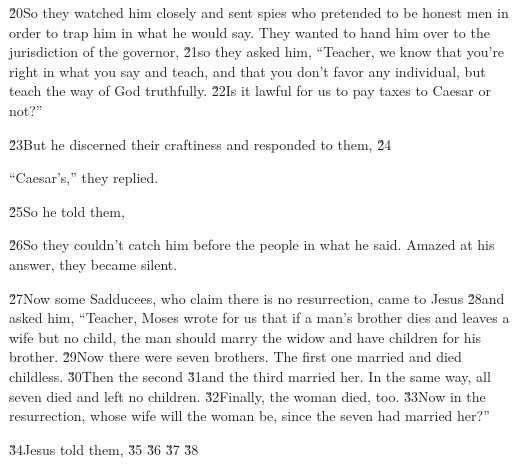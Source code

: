 \v{20}So they watched him closely and sent spies who pretended to be honest men in order to trap him in what he would say. They wanted to hand him over to the jurisdiction of the governor, \v{21}so they asked him, ``Teacher, we know that you're right in what you say and teach, and that you don't favor any individual, but teach the way of God truthfully. \v{22}Is it lawful for us to pay taxes to Caesar or not?''

\v{23}But he discerned their craftiness and responded to them, \v{24}

``Caesar's,'' they replied.

\v{25}So he told them, 

\v{26}So they couldn't catch him before the people in what he said. Amazed at his answer, they became silent.

\v{27}Now some Sadducees, who claim there is no resurrection, came to Jesus \v{28}and asked him, ``Teacher, Moses wrote for us that if a man's brother dies and leaves a wife but no child, the man should marry the widow and have children for his brother. \v{29}Now there were seven brothers. The first one married and died childless. \v{30}Then the second \v{31}and the third married her. In the same way, all seven died and left no children. \v{32}Finally, the woman died, too. \v{33}Now in the resurrection, whose wife will the woman be, since the seven had married her?''

\v{34}Jesus told them,  \v{35} \v{36} \v{37} \v{38}

